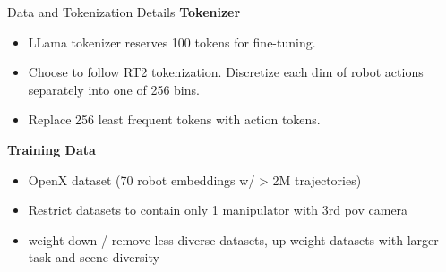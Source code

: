 \documentclass{beamer}
\begin{document}
\begin{frame}[t]{Data and Tokenization Details}
    \textbf{Tokenizer}
    \begin{itemize}[label=-]
        \item LLama tokenizer reserves 100 tokens for fine-tuning.
        \item Choose to follow RT2 tokenization. Discretize each dim of robot actions separately into one of 256 bins.
        \item Replace 256 least frequent tokens with action tokens.
    \end{itemize}
    \textbf{Training Data}
    \begin{itemize}[label=-]
        \item OpenX dataset (70 robot embeddings w/ > 2M trajectories)
        \item Restrict datasets to contain only 1 manipulator with 3rd pov camera
        \item weight down / remove less diverse datasets, up-weight datasets with larger task and scene diversity
    \end{itemize}
\end{frame}
\end{document}
